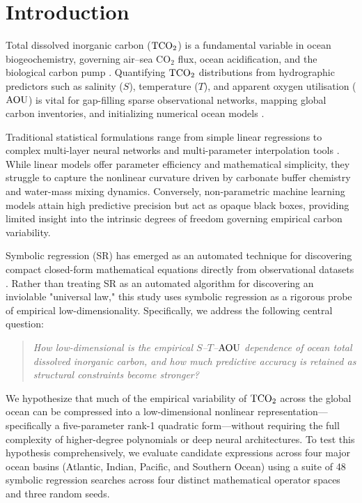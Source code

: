 \section{Introduction}
Total dissolved inorganic carbon ($\mathrm{TCO_2}$) is a fundamental variable in ocean biogeochemistry, governing air--sea $\mathrm{CO}_2$ flux, ocean acidification, and the biological carbon pump \citep{Sarmiento2006,Takahashi1993}. Quantifying $\mathrm{TCO_2}$ distributions from hydrographic predictors such as salinity ($S$), temperature ($T$), and apparent oxygen utilisation ($\mathrm{AOU}$) is vital for gap-filling sparse observational networks, mapping global carbon inventories, and initializing numerical ocean models \citep{Goyet1991,Key2004,Broullon2019}.

Traditional statistical formulations range from simple linear regressions \citep{Millero1998} to complex multi-layer neural networks \citep{Broullon2019} and multi-parameter interpolation tools \citep{Carter2018}. While linear models offer parameter efficiency and mathematical simplicity, they struggle to capture the nonlinear curvature driven by carbonate buffer chemistry and water-mass mixing dynamics. Conversely, non-parametric machine learning models attain high predictive precision but act as opaque black boxes, providing limited insight into the intrinsic degrees of freedom governing empirical carbon variability.

Symbolic regression (SR) has emerged as an automated technique for discovering compact closed-form mathematical equations directly from observational datasets \citep{Cranmer2023}. Rather than treating SR as an automated algorithm for discovering an inviolable "universal law," this study uses symbolic regression as a rigorous probe of empirical low-dimensionality. Specifically, we address the following central question:
\begin{quote}
\emph{How low-dimensional is the empirical $S$--$T$--$\mathrm{AOU}$ dependence of ocean total dissolved inorganic carbon, and how much predictive accuracy is retained as structural constraints become stronger?}
\end{quote}

We hypothesize that much of the empirical variability of $\mathrm{TCO_2}$ across the global ocean can be compressed into a low-dimensional nonlinear representation---specifically a five-parameter rank-1 quadratic form---without requiring the full complexity of higher-degree polynomials or deep neural architectures. To test this hypothesis comprehensively, we evaluate candidate expressions across four major ocean basins (Atlantic, Indian, Pacific, and Southern Ocean) using a suite of 48 symbolic regression searches across four distinct mathematical operator spaces and three random seeds.

